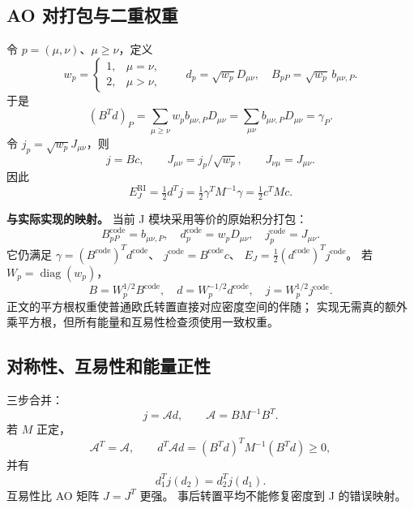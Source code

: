 \documentclass[UTF8,fontset=fandol,11pt,a4paper]{ctexart}
\numberwithin{equation}{section}
\newcommand{\diag}{\operatorname{diag}}
\begin{document}
\subsection{AO 对打包与二重权重}
\label{sec:packing}
令 \(p=(\mu,\nu)\)、\(\mu\geq\nu\)，定义
\begin{equation}
w_p=\begin{cases}1,&\mu=\nu,\\2,&\mu>\nu,\end{cases}
\qquad
d_p=\sqrt{w_p}D_{\mu\nu},\quad
B_{pP}=\sqrt{w_p}\,b_{\mu\nu,P}.
\label{eq:pack}
\end{equation}
于是
\begin{equation}
(B^Td)_P=\sum_{\mu\geq\nu}w_pb_{\mu\nu,P}D_{\mu\nu}
=\sum_{\mu\nu}b_{\mu\nu,P}D_{\mu\nu}=\gamma_P.
\end{equation}
令 \(j_p=\sqrt{w_p}J_{\mu\nu}\)，则
\begin{equation}
j=Bc,\qquad J_{\mu\nu}=j_p/\sqrt{w_p},\qquad
J_{\nu\mu}=J_{\mu\nu}.
\label{eq:unpack}
\end{equation}
因此
\begin{equation}
E_J^{\mathrm{RI}}=\tfrac12d^Tj
=\tfrac12\gamma^TM^{-1}\gamma=\tfrac12c^TMc.
\label{eq:rijenergy}
\end{equation}

\textbf{与实际实现的映射。}
当前 J 模块采用等价的原始积分打包：
\begin{equation}
B^{\mathrm{code}}_{pP}=b_{\mu\nu,P},\quad
d^{\mathrm{code}}_p=w_pD_{\mu\nu},\quad
j^{\mathrm{code}}_p=J_{\mu\nu}.
\end{equation}
它仍满足 \(\gamma=(B^{\mathrm{code}})^Td^{\mathrm{code}}\)、
\(j^{\mathrm{code}}=B^{\mathrm{code}}c\)、
\(E_J=\tfrac12(d^{\mathrm{code}})^Tj^{\mathrm{code}}\)。
若 \(W_p=\diag(w_p)\)，
\begin{equation}
B=W_p^{1/2}B^{\mathrm{code}},\quad
d=W_p^{-1/2}d^{\mathrm{code}},\quad
j=W_p^{1/2}j^{\mathrm{code}}.
\end{equation}
正文的平方根权重使普通欧氏转置直接对应密度空间的伴随；
实现无需真的额外乘平方根，但所有能量和互易性检查须使用一致权重。

\subsection{对称性、互易性和能量正性}
三步合并：
\begin{equation}
j=\mathcal A d,\qquad \mathcal A=BM^{-1}B^T.
\label{eq:operator}
\end{equation}
若 \(M\) 正定，
\begin{equation}
\mathcal A^T=\mathcal A,\qquad
d^T\mathcal A d=(B^Td)^TM^{-1}(B^Td)\geq0,
\end{equation}
并有
\begin{equation}
d_1^Tj(d_2)=d_2^Tj(d_1).
\label{eq:reciprocity}
\end{equation}
互易性比 AO 矩阵 \(J=J^T\) 更强。
事后转置平均不能修复密度到 J 的错误映射。
\end{document}
